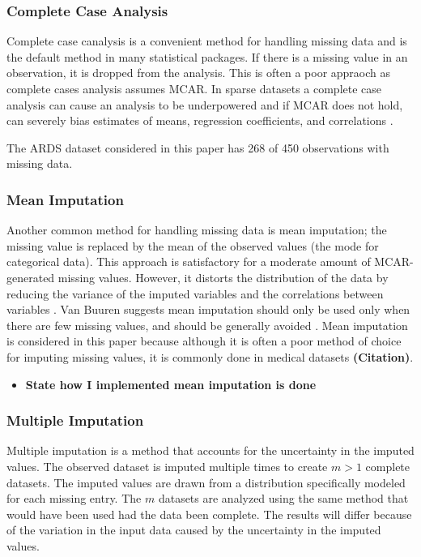 \documentclass[12pt,]{article}
\providecommand{\tightlist}{%
  \setlength{\itemsep}{0pt}\setlength{\parskip}{0pt}}
\begin{document}
\subsubsection{Complete Case Analysis}\label{complete-case-analysis}

Complete case canalysis is a convenient method for handling missing data
and is the default method in many statistical packages. If there is a
missing value in an observation, it is dropped from the analysis. This
is often a poor appraoch as complete cases analysis assumes MCAR. In
sparse datasets a complete case analysis can cause an analysis to be
underpowered and if MCAR does not hold, can severely bias estimates of
means, regression coefficients, and correlations
\citep{van_buuren_flexible_2012}.

The ARDS dataset considered in this paper has 268 of 450 observations
with missing data.

\subsubsection{Mean Imputation}\label{mean-imputation}

Another common method for handling missing data is mean imputation; the
missing value is replaced by the mean of the observed values (the mode
for categorical data). This approach is satisfactory for a moderate
amount of MCAR-generated missing values. However, it distorts the
distribution of the data by reducing the variance of the imputed
variables and the correlations between variables
\citep{little_bayes_2014}. Van Buuren suggests mean imputation should
only be used only when there are few missing values, and should be
generally avoided \citep{van_buuren_flexible_2012}. Mean imputation is
considered in this paper because although it is often a poor method of
choice for imputing missing values, it is commonly done in medical
datasets \textbf{(Citation)}.

\begin{itemize}
\tightlist
\item
  \textbf{State how I implemented mean imputation is done}
\end{itemize}

\subsubsection{Multiple Imputation}\label{multiple-imputation}

Multiple imputation is a method that accounts for the uncertainty in the
imputed values. The observed dataset is imputed multiple times to create
\(m>1\) complete datasets. The imputed values are drawn from a
distribution specifically modeled for each missing entry. The \(m\)
datasets are analyzed using the same method that would have been used
had the data been complete. The results will differ because of the
variation in the input data caused by the uncertainty in the imputed
values.
\end{document}
